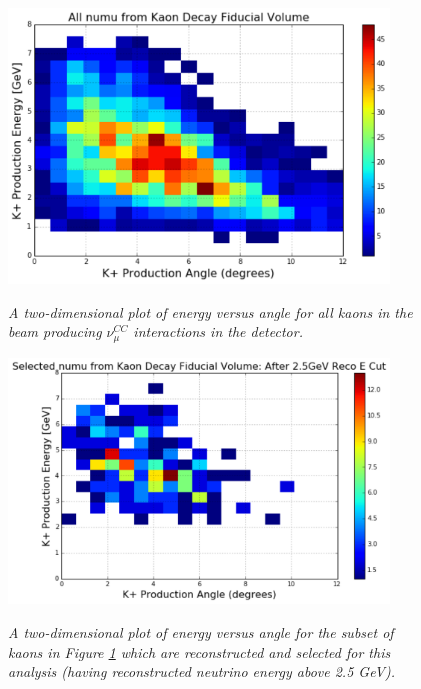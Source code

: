 \begin{figure}[ht!]
\centering
	\includegraphics[width=0.9\textwidth]{Figures/all_kaon_energy_angle_2d.png} \\
\caption{\textit{A two-dimensional plot of energy versus angle for all kaons in the beam producing $\nu_\mu^{CC}$ interactions in the detector.}}\label{all_kaon_energy_angle_2d}
\end{figure}


\begin{figure}[ht!]
\centering
	\includegraphics[width=0.9\textwidth]{Figures/selected_kaon_energy_angle_2d.png} \\
\caption{\textit{A two-dimensional plot of energy versus angle for the subset of kaons in Figure \ref{all_kaon_energy_angle_2d} which are reconstructed and selected for this analysis (having reconstructed neutrino energy above 2.5 GeV).}}\label{selected_kaon_energy_angle_2d}
\end{figure}


